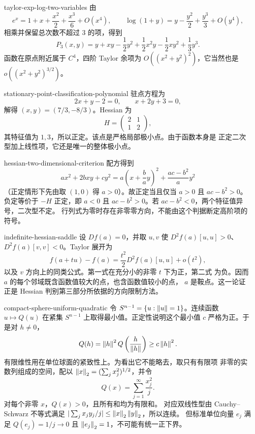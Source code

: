 \begin{solution}{taylor-exp-log-two-variables}
由
\[
 e^x=1+x+\frac{x^2}{2}+\frac{x^3}{6}+O(x^4),\qquad
 \log(1+y)=y-\frac{y^2}{2}+\frac{y^3}{3}+O(y^4),
\]
相乘并保留总次数不超过 $3$ 的项，得到
\[
 P_3(x,y)=y+xy-\frac12y^2+\frac12x^2y-\frac12xy^2+\frac13y^3.
\]
函数在原点附近属于 $C^4$，四阶 Taylor 余项为
$O((x^2+y^2)^2)$，它当然也是
$o((x^2+y^2)^{3/2})$。
\end{solution}

\begin{solution}{stationary-point-classification-polynomial}
驻点方程为
\[
 2x+y-2=0,\qquad x+2y+3=0,
\]
解得 $(x,y)=(7/3,-8/3)$。Hessian 为
\[
 H=\begin{pmatrix}2&1\\1&2\end{pmatrix},
\]
其特征值为 $1,3$，所以正定。该点是严格局部极小点。由于函数本身是
正定二次型加上线性项，它还是唯一的整体极小点。
\end{solution}

\begin{solution}{hessian-two-dimensional-criterion}
配方得到
\[
 ax^2+2bxy+cy^2
 =a\left(x+\frac ba y\right)^2+\frac{ac-b^2}{a}y^2
\]
（正定情形下先由取 $(1,0)$ 得 $a>0$）。故正定当且仅当
$a>0$ 且 $ac-b^2>0$。负定等价于 $-H$ 正定，即
$a<0$ 且 $ac-b^2>0$。若 $ac-b^2<0$，两个特征值异号，二次型不定。
行列式为零时存在非零零方向，不能由这个判据断定高阶项的符号。
\end{solution}

\begin{solution}{indefinite-hessian-saddle}
设 $Df(a)=0$，并取 $u,v$ 使
$D^2f(a)[u,u]>0$、$D^2f(a)[v,v]<0$。Taylor 展开为
\[
 f(a+tu)-f(a)=\frac{t^2}{2}D^2f(a)[u,u]+o(t^2),
\]
以及 $v$ 方向上的同类公式。第一式在充分小的非零 $t$ 下为正，第二式
为负。因而 $a$ 的每个邻域既含函数值较大的点，也含函数值较小的点，
$a$ 是鞍点。这一论证正是 Hessian 判别第三部分所依据的方向限制方法。
\end{solution}

\begin{solution}{compact-sphere-uniform-quadratic}
令 $S^{n-1}=\{u:\left\lVert u\right\rVert=1\}$。连续函数 $u\mapsto Q(u)$ 在紧集
$S^{n-1}$ 上取得最小值。正定性说明这个最小值 $c$ 严格为正。于是对
$h\ne0$，
\[
 Q(h)=\left\lVert h\right\rVert^2Q\left(\frac h{\left\lVert h\right\rVert}\right)\ge c\left\lVert h\right\rVert^2.
\]
有限维性用在单位球面的紧致性上。为看出它不能略去，取只有有限项
非零的实数列组成的空间，配以 \(\left\lVert x\right\rVert_2=(\sum_jx_j^2)^{1/2}\)，并令
\[
 Q(x)=\sum_{j=1}^{\infty}\frac{x_j^2}{j}.
\]
对每个非零 \(x\)，\(Q(x)>0\)，且所有和均为有限和。
对应双线性型由 Cauchy--Schwarz 不等式满足
\(|\sum_jx_jy_j/j|\le\left\lVert x\right\rVert_2\left\lVert y\right\rVert_2\)，所以连续。
但标准单位向量 \(e_j\) 满足 \(Q(e_j)=1/j\to0\) 且
\(\left\lVert e_j\right\rVert_2=1\)，不可能有统一正下界。
\end{solution}

